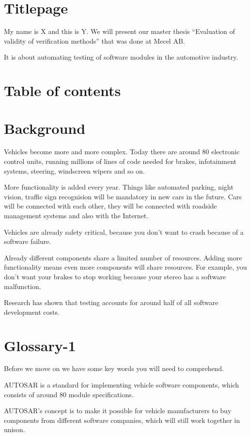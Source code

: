 \documentclass[a4paper]{article}
\begin{document}
\section{Titlepage}
My name is X and this is Y. We will present our master thesis
``Evaluation of validity of verification methods'' that was done at
Mecel AB.

It is about automating testing of software modules in the automotive
industry.

\section{Table of contents}

\section{Background}
Vehicles become more and more complex. Today there are around 80
electronic control units, running millions of lines of code needed for
brakes, infotainment systems, steering, windscreen wipers and so on.

More functionality is added every year. Things like automated parking,
night vision, traffic sign recognision will be mandatory in new cars
in the future. Cars will be connected with each other, they will be
connected with roadside management systems and also with the Internet.

Vehicles are already safety critical, because you don't want to crash
because of a software failure.

Already different components share a limited number of
resources. Adding more functionality means even more components will
share resources. For example, you don't want your brakes to stop
working because your stereo has a software malfunction.

Research has shown that testing accounts for around half of all
software development costs.

\section{Glossary-1}
Before we move on we have some key words you will need to comprehend.

AUTOSAR is a standard for implementing vehicle software components,
which consists of around 80 module specifications.

AUTOSAR's concept is to make it possible for vehicle manufacturers to
buy components from different software companies, which will still
work together in unison.
\end{document}

